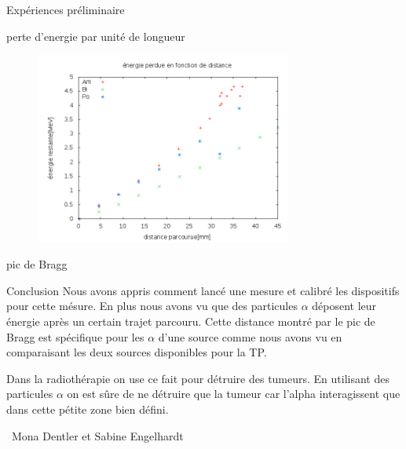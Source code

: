 \documentclass[a4paper,11pt]{scrartcl}
\begin{document}
\begin{section}{Expériences préliminaire}
\begin{subsection}{perte d'energie par unité de longueur}
\begin{figure}[hbt]
\begin{center}
     \end{center}
    \end{figure}
\begin{figure}[hbt]
     \begin{center}
      \includegraphics[width=0.75\textwidth]{Bilder/energie_perdue.png}
     \end{center}
    \end{figure}

\end{subsection}
\begin{subsection}{pic de Bragg}
\end{subsection}
\end{section}
 \begin{section}{Conclusion}
  Nous avons appris comment lancé une mesure et calibré les dispositifs pour cette mésure. En plus nous avons vu que des particules $\alpha$ déposent leur énergie après un certain trajet parcouru. Cette distance montré par le pic de Bragg est spécifique pour les $\alpha$ d'une source comme nous avons vu en comparaisant les deux sources disponibles pour la TP.
  
  Dans la radiothérapie on use ce fait pour détruire des tumeurs. En utilisant des particules $\alpha$ on est sûre de ne détruire que la tumeur car l'alpha interagissent que dans cette pétite zone bien défini.
 \end{section}

 \vspace{1cm}
 \begin{flushright}
  \titlefont \textcopyleft\ Mona Dentler et Sabine Engelhardt
 \end{flushright}
\end{document}

